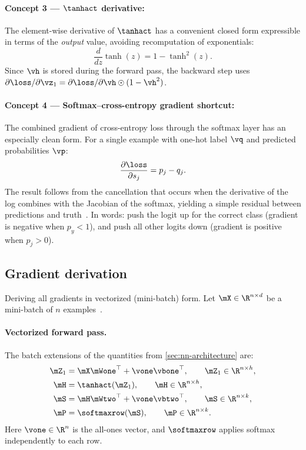 \documentclass[sigconf,screen,nonacm]{acmart}
\begin{document}
\paragraph{Concept 3 --- $\tanhact$ derivative:}
The element-wise derivative of $\tanhact$ has a convenient closed form expressible in terms of the \emph{output} value, avoiding recomputation of exponentials:
\begin{equation}
    \frac{d}{dz}\tanh(z) = 1 - \tanh^2(z).
    \label{eq:tanh-deriv}
\end{equation}
Since $\vh$ is stored during the forward pass, the backward step uses $\partial\loss/\partial\vz_1 = \partial\loss/\partial\vh \odot (1 - \vh^2)$.

\paragraph{Concept 4 --- Softmax--cross-entropy gradient shortcut:}
The combined gradient of cross-entropy loss through the softmax layer has an especially clean form. For a single example with one-hot label $\vq$ and predicted probabilities $\vp$:
\begin{equation}
    \frac{\partial \loss}{\partial s_j} = p_j - q_j.
    \label{eq:softmax-grad-clean}
\end{equation}
The result follows from the cancellation that occurs when the derivative of the log combines with the Jacobian of the softmax, yielding a simple residual between predictions and truth~\cite{murphy2022pml}. In words: push the logit up for the correct class (gradient is negative when $p_y < 1$), and push all other logits down (gradient is positive when $p_j > 0$).

\subsection{Gradient derivation}
\label{sec:gradient-derivation}

Deriving all gradients in vectorized (mini-batch) form. Let $\mX \in \R^{n \times d}$ be a mini-batch of $n$ examples~\cite{goodfellow2016deep,cs229dlnotes}.

\paragraph{Vectorized forward pass.}
The batch extensions of the quantities from \cref{sec:nn-architecture} are:
\begin{align}
    \mZ_1 &= \mX \mWone^\top + \vone \vbone^\top, \qquad \mZ_1 \in \R^{n \times h}, \label{eq:batch-z1} \\
    \mH   &= \tanhact(\mZ_1), \qquad \mH \in \R^{n \times h}, \label{eq:batch-h} \\
    \mS   &= \mH \mWtwo^\top + \vone \vbtwo^\top, \qquad \mS \in \R^{n \times k}, \label{eq:batch-s} \\
    \mP   &= \softmaxrow(\mS), \qquad \mP \in \R^{n \times k}. \label{eq:batch-p}
\end{align}
Here $\vone \in \R^n$ is the all-ones vector, and $\softmaxrow$ applies softmax independently to each row.
\end{document}
